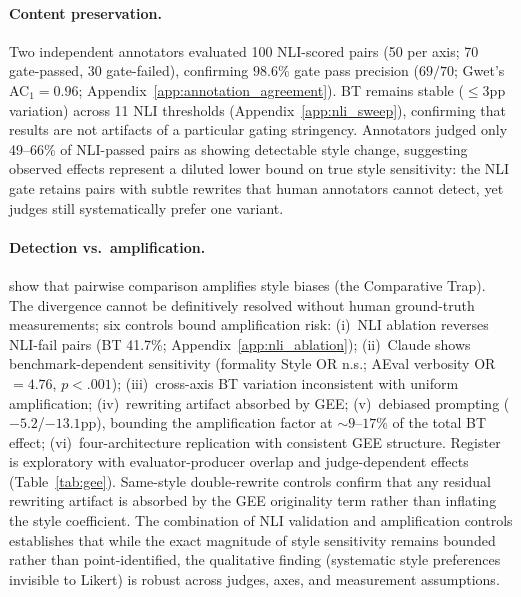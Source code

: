 \paragraph{Content preservation.}
Two independent annotators evaluated 100 NLI-scored pairs (50 per axis; 70 gate-passed, 30 gate-failed), confirming $98.6\%$ gate pass precision ($69/70$; Gwet's AC$_1 = 0.96$; Appendix~\ref{app:annotation_agreement}).
\label{sec:nli_threshold}
BT remains stable (${\leq}3$pp variation) across 11 NLI thresholds (Appendix~\ref{app:nli_sweep}), confirming that results are not artifacts of a particular gating stringency.
Annotators judged only 49--66\% of NLI-passed pairs as showing detectable style change, suggesting observed effects represent a diluted lower bound on true style sensitivity: the NLI gate retains pairs with subtle rewrites that human annotators cannot detect, yet judges still systematically prefer one variant.

\paragraph{Detection vs.\ amplification.}
\label{sec:amplification}
\citet{jeong2025comparative} show that pairwise comparison amplifies style biases (the Comparative Trap).
The divergence cannot be definitively resolved without human ground-truth measurements; six controls bound amplification risk: (i)~NLI ablation reverses NLI-fail pairs (BT 41.7\%; Appendix~\ref{app:nli_ablation}); (ii)~Claude shows benchmark-dependent sensitivity (formality Style OR n.s.; AEval verbosity OR $= 4.76$, $p < .001$); (iii)~cross-axis BT variation inconsistent with uniform amplification; (iv)~rewriting artifact absorbed by GEE; (v)~debiased prompting ($-5.2$/$-13.1$pp), bounding the amplification factor at ${\sim}9$--$17\%$ of the total BT effect; (vi)~four-architecture replication with consistent GEE structure.
Register is exploratory with evaluator-producer overlap and judge-dependent effects (Table~\ref{tab:gee}).
Same-style double-rewrite controls confirm that any residual rewriting artifact is absorbed by the GEE originality term rather than inflating the style coefficient.
The combination of NLI validation and amplification controls establishes that while the exact magnitude of style sensitivity remains bounded rather than point-identified, the qualitative finding (systematic style preferences invisible to Likert) is robust across judges, axes, and measurement assumptions.
